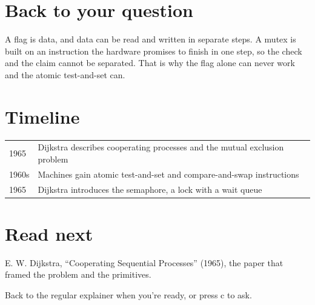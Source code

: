 \documentclass[11pt]{article}
\begin{document}
\section{Back to your question}
A flag is data, and data can be read and written in separate steps. A mutex is built on an instruction the hardware promises to finish in one step, so the check and the claim cannot be separated. That is why the flag alone can never work and the atomic test-and-set can.

\section{Timeline}
\begin{tabular}{@{}ll@{}}
\toprule
1965 & Dijkstra describes cooperating processes and the mutual exclusion problem \\
1960s & Machines gain atomic test-and-set and compare-and-swap instructions \\
1965 & Dijkstra introduces the semaphore, a lock with a wait queue \\
\bottomrule
\end{tabular}

\section{Read next}
E. W. Dijkstra, ``Cooperating Sequential Processes'' (1965), the paper that framed the problem and the primitives.

Back to the regular explainer when you're ready, or press c to ask.
\end{document}
